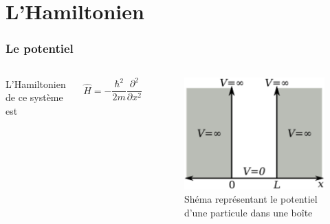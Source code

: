 \documentclass{beamer}
\begin{document}
\section{L'Hamiltonien}
\begin{frame}
\frametitle{Le potentiel}

\begin{columns}
L'Hamiltonien de ce système est

\begin{equation}\tag{3}
\hat{H}=-\frac{\hbar^2}{2m}\frac{\partial^2}{\partial x^2}
\end{equation} 

\begin{figure}
\includegraphics[scale=0.4]{Pot}
\caption{Shéma représentant le potentiel d'une particule dans une boîte}
\end{figure}
\end{columns}

\end{frame}
\end{document}
